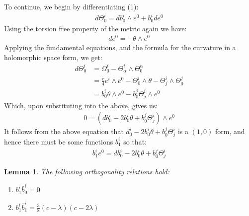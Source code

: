 \documentclass[11pt]{amsart}
\newtheorem{lem}[subsection]{Lemma}
\theoremstyle{definition}
\theoremstyle{definition}
\begin{document}
To continue, we begin by differentiating (1):
%
\begin{align*}
d \Theta^i_0 = d b^i_0 \wedge e^0 + b^i_0 d e^0
\end{align*}
%
Using the torsion free property of the metric again we have:
%
\begin{align*}
d e^0 = - \theta \wedge e^0
\end{align*}
%
Applying the fundamental equations, and the formula for the curvature in a holomorphic space form, we get:
%
\begin{align*}
d \Theta^i_0 &= \Omega^i_0 - \Theta^i_{\alpha} \wedge \Theta^{\alpha}_0 \\
&= \frac{c}{4} e^i \wedge \bar{e}^0 - \Theta^i_0 \wedge \theta - \Theta^i_j \wedge \Theta^j_0 \\
&= b^i_0 \theta \wedge e^0 - b^j_0 \Theta^i_j \wedge e^0
\end{align*}
%
Which, upon substituting into the above, gives us:
%
\begin{align*}
0 = ( d b^i_0 - 2 b^i_0 \theta + b^j_0 \Theta^i_j ) \wedge e^0 
\end{align*}
%
It follows from the above equation that $d^i_0 - 2 b^i_0 \theta + b^j_0 \Theta^i_j$ is a $(1,0)$ form, and hence there must be some functions $b^i_1$ so that:
%
\begin{align}
b^i_1 e^0 = d b^i_0 - 2 b^i_0 \theta + b^j_0 \Theta^i_j  
\end{align}

\begin{lem} The following orthogonality relations hold:
%
\begin{enumerate}
\item $b^i_1 \bar{b}^i_0 = 0$
\item $b^i_1 \bar{b}^i_1 = \frac{3}{8}(c - \lambda)(c - 2 \lambda)$
\end{enumerate}
%
\end{lem}
\end{document}
